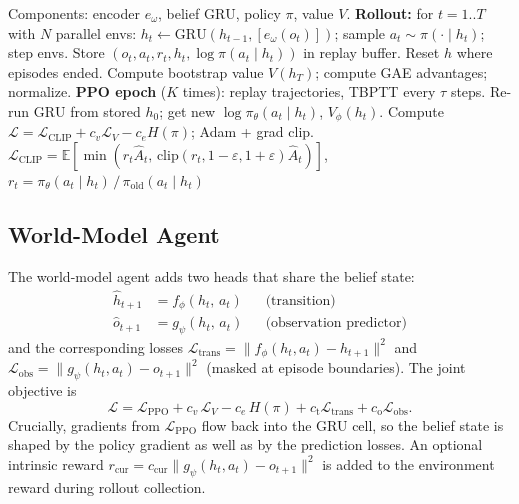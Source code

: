 \documentclass[letterpaper]{article}
\begin{document}
\begin{algorithm}[!tbp]
\caption{Recurrent PPO --- one training update}
\label{alg:rppo}
\begin{algorithmic}[1]
\State Components: encoder $e_\omega$, belief $\mathrm{GRU}$, policy $\pi$,
value $V$.
\State \textbf{Rollout:} for $t = 1..T$ with $N$ parallel envs:
\State \quad $h_t \gets \mathrm{GRU}(h_{t-1}, [e_\omega(o_t)])$;
sample $a_t \sim \pi(\cdot \mid h_t)$; step envs.
\State \quad Store $(o_t, a_t, r_t, h_t, \log\pi(a_t \mid h_t))$ in replay buffer.
\State \quad Reset $h$ where episodes ended.
\State Compute bootstrap value $V(h_T)$; compute GAE advantages; normalize.
\State \textbf{PPO epoch} ($K$ times): replay trajectories, TBPTT every $\tau$ steps.
\State \quad Re-run $\mathrm{GRU}$ from stored $h_0$; get new $\log\pi_\theta(a_t \mid h_t)$,
$V_\phi(h_t)$.
\State \quad Compute
$\mathcal{L} = \mathcal{L}_{\text{CLIP}} + c_v \mathcal{L}_V - c_e H(\pi)$;
Adam + grad clip.
\State \quad $\mathcal{L}_{\text{CLIP}} = \mathbb{E}\!\left[\min\!\left(r_t \hat{A}_t,\,
\mathrm{clip}(r_t, 1{-}\varepsilon, 1{+}\varepsilon)\hat{A}_t\right)\right]$,
\hfill $r_t = \pi_\theta(a_t \mid h_t)\,/\,\pi_{\text{old}}(a_t \mid h_t)$
\end{algorithmic}
\end{algorithm}

\subsection{World-Model Agent}

The world-model agent adds two heads that share the belief state:
\begin{align}
    \hat h_{t+1} &= f_\phi(h_t,\, a_t) && \text{(transition)} \\
    \hat o_{t+1} &= g_\psi(h_t,\, a_t) && \text{(observation predictor)}
\end{align}
and the corresponding losses
$\mathcal{L}_{\text{trans}} = \lVert f_\phi(h_t, a_t) - h_{t+1}\rVert^2$
and
$\mathcal{L}_{\text{obs}} = \lVert g_\psi(h_t, a_t) - o_{t+1}\rVert^2$
(masked at episode boundaries). The joint objective is
\begin{equation}
    \mathcal{L} = \mathcal{L}_{\text{PPO}} + c_v\,\mathcal{L}_V
                  - c_e\,H(\pi)
                  + c_\text{t}\mathcal{L}_{\text{trans}}
                  + c_\text{o}\mathcal{L}_{\text{obs}}.
\end{equation}
Crucially, gradients from $\mathcal{L}_{\text{PPO}}$ flow back into the GRU
cell, so the belief state is shaped by the policy gradient as well as by
the prediction losses. An optional intrinsic reward
$r_\text{cur} = c_\text{cur}\lVert g_\psi(h_t, a_t) - o_{t+1}\rVert^2$
is added to the environment reward during rollout collection.
\end{document}
